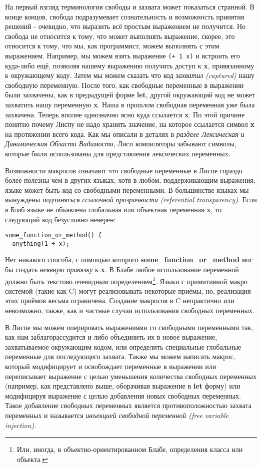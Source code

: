 На первый взгляд терминология свободы и захвата может показаться странной. В конце концов, свобода подразумевает сознательность и возможность принятия решений - очевидно, что выразить всё простым выражением не получится. Но свобода не относится к тому, что может выполнять выражение, скорее, это относится к тому, что мы, как программист, можем выполнять с этим выражением. Например, мы можем взять выражение \verb'(+ 1 x)' и встроить его куда-либо ещё, позволяя нашему выражению получить доступ к \textbf{x}, привязанному к окружающему коду. Затем мы можем сказать что код \emph{захватил (captured)} нашу свободную переменную. После того, как свободные переменные в выражении были захвачены, как в предыдущей форме \textbf{let}, другой окружающий код не может захватить нашу переменную \textbf{x}. Наша в прошлом свободная переменная уже была захвачена. Теперь вполне однозначно ясно куда ссылается \textbf{x}. По этой причине понятно почему Лиспу не надо хранить значение, на которое ссылается символ \textbf{x} на протяжении всего кода. Как мы описали в деталях в \emph{разделе Лексическая и Динамическая Области Видимости}, Лисп компиляторы забывают символы, которые были использованы для представления лексических переменных.

Возможности макросов означают что свободные переменные в Лиспе гораздо более полезны чем в других языках, хотя в любом, поддерживающим выражения, языке может быть код со свободными переменными. В большинстве языках мы вынуждены подчиняться \emph{ссылочной прозрачности (referential transparency)}. Если в Блаб языке не объявлена глобальная или объектная переменная \textbf{x}, то следующий код безусловно неверен:

\begin{verbatim}
some_function_or_method() {
  anything(1 + x);
\end{verbatim}

Нет никакого способа, с помощью которого {\textbf{so\-me\_func\-tion\_or\_me\-thod}} мог бы создать \emph{неявную привязку} к \textbf{x}. В Блабе любое использование переменной должно быть текстово очевидным определением\footnote{Или, иногда, в объектно-ориентированном Блабе, определения класса или объекта.}. Языки с примитивной макро системой (такие как C) могут реализовывать некоторые приёмы, но, реализация этих приёмов весьма ограничена. Создание макросов в C непрактично или невозможно, также, как и частные случаи использования свободных переменных.

В Лиспе мы можем оперировать выражениями со свободными переменными так, как нам заблагорассудится и либо объединить их в новое выражение, захватываемое окружающим кодом, или определить специальные глобальные переменные для последующего захвата. Также мы можем написать макрос, который модифицирует и освобождает переменные в выражении или переписывает выражение с целью уменьшения количества свободных переменных (например, как представлено выше, оборачивая выражение в \textbf{let} форму) или модифицируя выражение с целью добавления новых свободных переменных. Такое добавление свободных переменных является противоположностью захвата переменных и называется \emph{инъекцией свободной переменной (free variable injection)}.


